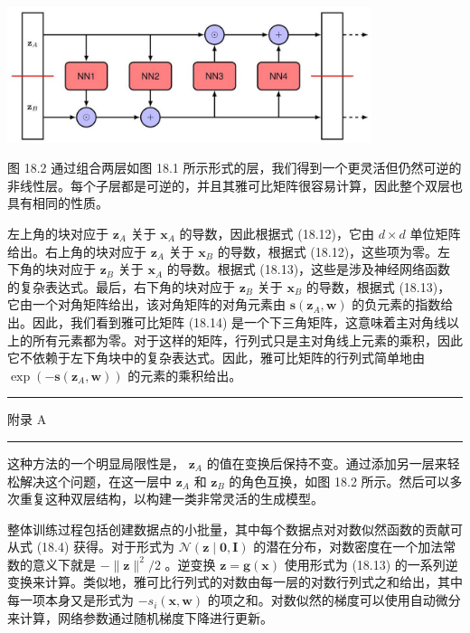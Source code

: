 \documentclass[10pt]{article}
\newcommand{\HRule}{\begin{center}\rule{0.9\linewidth}{0.2mm}\end{center}}
\begin{document}
\begin{center}
\includegraphics[max width=0.8\textwidth]{images/0194e279-9b28-703a-88f4-c3ac21e2010d_570_316_342_1098_408_0.jpg}
\end{center}
\hspace*{3em} 

图 18.2 通过组合两层如图 18.1 所示形式的层，我们得到一个更灵活但仍然可逆的非线性层。每个子层都是可逆的，并且其雅可比矩阵很容易计算，因此整个双层也具有相同的性质。

左上角的块对应于 \({\mathbf{z}}_{A}\) 关于 \({\mathbf{x}}_{A}\) 的导数，因此根据式 (18.12)，它由 \(d \times  d\) 单位矩阵给出。右上角的块对应于 \({\mathbf{z}}_{A}\) 关于 \({\mathbf{x}}_{B}\) 的导数，根据式 (18.12)，这些项为零。左下角的块对应于 \({\mathbf{z}}_{B}\) 关于 \({\mathbf{x}}_{A}\) 的导数。根据式 (18.13)，这些是涉及神经网络函数的复杂表达式。最后，右下角的块对应于 \({\mathbf{z}}_{B}\) 关于 \({\mathbf{x}}_{B}\) 的导数，根据式 (18.13)，它由一个对角矩阵给出，该对角矩阵的对角元素由 \(\mathbf{s}\left( {{\mathbf{z}}_{A},\mathbf{w}}\right)\) 的负元素的指数给出。因此，我们看到雅可比矩阵 (18.14) 是一个下三角矩阵，这意味着主对角线以上的所有元素都为零。对于这样的矩阵，行列式只是主对角线上元素的乘积，因此它不依赖于左下角块中的复杂表达式。因此，雅可比矩阵的行列式简单地由 \(\exp \left( {-\mathbf{s}\left( {{\mathbf{z}}_{A},\mathbf{w}}\right) }\right)\) 的元素的乘积给出。

\HRule

附录 A

\HRule

这种方法的一个明显局限性是， \({\mathbf{z}}_{A}\) 的值在变换后保持不变。通过添加另一层来轻松解决这个问题，在这一层中 \({\mathbf{z}}_{A}\) 和 \({\mathbf{z}}_{B}\) 的角色互换，如图 18.2 所示。然后可以多次重复这种双层结构，以构建一类非常灵活的生成模型。

整体训练过程包括创建数据点的小批量，其中每个数据点对对数似然函数的贡献可从式 (18.4) 获得。对于形式为 \(\mathcal{N}\left( {\mathbf{z} \mid  \mathbf{0},\mathbf{I}}\right)\) 的潜在分布，对数密度在一个加法常数的意义下就是 \(- \parallel \mathbf{z}{\parallel }^{2}/2\) 。逆变换 \(\mathbf{z} = \mathbf{g}\left( \mathbf{x}\right)\) 使用形式为 (18.13) 的一系列逆变换来计算。类似地，雅可比行列式的对数由每一层的对数行列式之和给出，其中每一项本身又是形式为 \(- {s}_{i}\left( {\mathbf{x},\mathbf{w}}\right)\) 的项之和。对数似然的梯度可以使用自动微分来计算，网络参数通过随机梯度下降进行更新。
\end{document}
